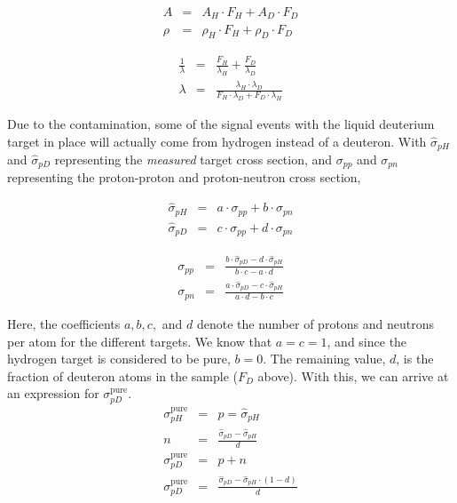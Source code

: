 \noindent\begin{minipage}{.5\linewidth}
	\begin{eqnarray}
	A & = & A_H\cdot F_H + A_D \cdot F_D \\
	\rho & = & \rho_H\cdot F_H + \rho_D \cdot F_D
	\end{eqnarray}
\end{minipage}%
\begin{minipage}{.5\linewidth}
	\begin{eqnarray}
	\frac{1}{\lambda } & = & \frac{F_H}{\lambda_H} + \frac{F_D}{\lambda_D} \\
	\lambda & = & \frac{\lambda_H \cdot \lambda_D}{F_H \cdot \lambda_D + F_D \cdot \lambda_H}	
	\end{eqnarray}
\end{minipage}
\newline

Due to the contamination, some of the signal events with the liquid deuterium target in place will actually come from hydrogen instead of a deuteron. With $\hat{\sigma}_{pH}$ and $\hat{\sigma}_{pD}$ representing the \emph{measured} target cross section, and $\sigma_{pp}$ and $\sigma_{pn}$ representing the proton-proton and proton-neutron cross section, 

\noindent\begin{minipage}{.5\linewidth}
	\begin{eqnarray}
	\hat{\sigma}_{pH} & = & a \cdot \sigma_{pp} + b \cdot \sigma_{pn} \\
	\hat{\sigma}_{pD} & = & c \cdot \sigma_{pp} + d \cdot \sigma_{pn}
	\end{eqnarray}
\end{minipage}%
\begin{minipage}{.5\linewidth}
	\begin{eqnarray}
	\sigma_{pp} & = & \frac{b \cdot \hat{\sigma}_{pD} - d \cdot \hat{\sigma}_{pH}}{b \cdot c - a \cdot d} \\
	\sigma_{pn} & = & \frac{a \cdot \hat{\sigma}_{pD} - c \cdot \hat{\sigma}_{pH}}{a \cdot d - b \cdot c}
	\end{eqnarray}
\end{minipage}
\newline

\noindent Here, the coefficients $a, b, c,$ and $d$ denote the number of protons and neutrons per atom for the different targets. We know that $a=c=1$, and since the hydrogen target is considered to be pure, $b=0$. The remaining value, $d$, is the fraction of deuteron atoms in the sample ($F_D$ above). With this, we can arrive at an expression for $\sigma_{pD}^{\text{pure}}$.
\begin{eqnarray}
\sigma_{pH}^{\text{pure}} & = & p = \hat{\sigma}_{pH} \\
n & = & \frac{\hat{\sigma}_{pD} - \hat{\sigma}_{pH}}{d} \\
\sigma_{pD}^{\text{pure}} & = & p + n \\
\sigma_{pD}^{\text{pure}} & = & \frac{\hat{\sigma}_{pD} - \hat{\sigma}_{pH}\cdot (1-d)}{d}
\end{eqnarray}

